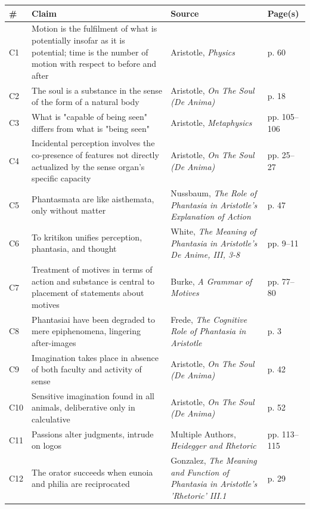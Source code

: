 \begin{center}
\footnotesize
\begin{tabular}{|l|l|l|l|}
\hline
\textbf{\#} & \textbf{Claim} & \textbf{Source} & \textbf{Page(s)} \\
\hline
C1 & Motion is the fulfilment of what is potentially insofar as it is potential; time is the number of motion with respect to before and after & Aristotle, \textit{Physics} & p. 60 \\
\hline
C2 & The soul is a substance in the sense of the form of a natural body & Aristotle, \textit{On The Soul (De Anima)} & p. 18 \\
\hline
C3 & What is "capable of being seen" differs from what is "being seen" & Aristotle, \textit{Metaphysics} & pp. 105--106 \\
\hline
C4 & Incidental perception involves the co-presence of features not directly actualized by the sense organ's specific capacity & Aristotle, \textit{On The Soul (De Anima)} & pp. 25--27 \\
\hline
C5 & Phantasmata are like aisthemata, only without matter & Nussbaum, \textit{The Role of Phantasia in Aristotle's Explanation of Action} & p. 47 \\
\hline
C6 & To kritikon unifies perception, phantasia, and thought & White, \textit{The Meaning of Phantasia in Aristotle's De Anime, III, 3-8} & pp. 9--11 \\
\hline
C7 & Treatment of motives in terms of action and substance is central to placement of statements about motives & Burke, \textit{A Grammar of Motives} & pp. 77--80 \\
\hline
C8 & Phantasiai have been degraded to mere epiphenomena, lingering after-images & Frede, \textit{The Cognitive Role of Phantasia in Aristotle} & p. 3 \\
\hline
C9 & Imagination takes place in absence of both faculty and activity of sense & Aristotle, \textit{On The Soul (De Anima)} & p. 42 \\
\hline
C10 & Sensitive imagination found in all animals, deliberative only in calculative & Aristotle, \textit{On The Soul (De Anima)} & p. 52 \\
\hline
C11 & Passions alter judgments, intrude on logos & Multiple Authors, \textit{Heidegger and Rhetoric} & pp. 113--115 \\
\hline
C12 & The orator succeeds when eunoia and philia are reciprocated & Gonzalez, \textit{The Meaning and Function of Phantasia in Aristotle's 'Rhetoric' III.1} & p. 29 \\

\end{tabular}
\end{center}
